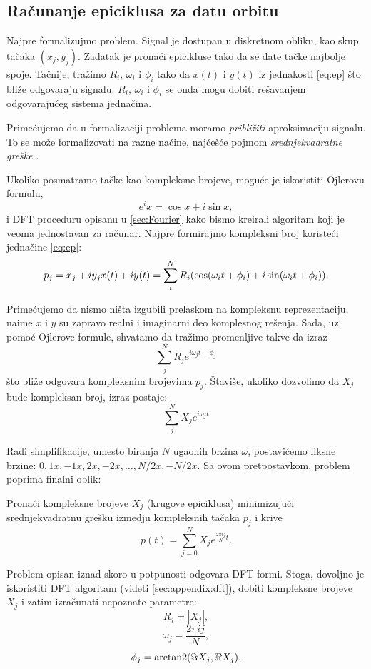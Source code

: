 \subsection{Ra\v{c}unanje epiciklusa za datu orbitu}

Najpre formalizujmo problem. Signal je dostupan u diskretnom obliku, kao skup ta\v{c}aka $(x_j,y_j)$. Zadatak je prona\'c{}i epicikluse tako da se date ta\v{c}ke najbolje spoje. Ta\v{c}nije, tra\v{z}imo $R_i$, $\omega_i$ i $\phi_i$ tako da $x(t)$ i $y(t)$ iz jednakosti \ref{eq:ep} \v{s}to bli\v{z}e odgovaraju signalu. $R_i$, $\omega_i$ i $\phi_i$ se onda mogu dobiti re\v{s}avanjem odgovaraju\'c{}eg sistema jedna\v{c}ina.

Prime\'c{}ujemo da u formalizaciji problema moramo \emph{pribli\v{z}iti} aproksimaciju signalu. To se mo\v{z}e formalizovati na razne na\v{c}ine, naj\v{c}e\v{s}\'c{}e pojmom \emph{srednjekvadratne gre\v{s}ke} \cite{NI}.

Ukoliko posmatramo ta\v{c}ke kao kompleksne brojeve, mogu\'c{}e je iskoristiti Ojlerovu formulu,
$$e^ix = \cos x + i\sin x,$$
i DFT proceduru opisanu u \ref{sec:Fourier} kako bismo kreirali algoritam koji je veoma jednostavan za ra\v{c}unar. Najpre formirajmo kompleksni broj koriste\'c{}i jedna\v{c}ine \ref{eq:ep}:
$$p_j = x_j + iy_j \\ x(t) + iy(t) = \sum_i^N R_i(\cos(\omega_i t + \phi_i) + i\sin(\omega_i t + \phi_i)).$$

Prime\'c{}ujemo da nismo ni\v{s}ta izgubili prelaskom na kompleksnu reprezentaciju, naime $x$ i $y$ su zapravo realni i imaginarni deo komplesnog re\v{s}enja. Sada, uz pomo\'c{} Ojlerove formule, shvatamo da tra\v{z}imo promenljive takve da izraz
$$\sum_j^N R_je^{i\omega_j t+ \phi_j}$$
\v{s}to bli\v{z}e odgovara kompleksnim brojevima $p_j$. \v{S}tavi\v{s}e, ukoliko dozvolimo da $X_j$ bude kompleksan broj, izraz postaje:
$$\sum_j^N X_je^{i\omega_j t}$$

Radi simplifikacije, umesto biranja $N$ ugaonih brzina $\omega$, postavi\'c{}emo fiksne brzine: $0, 1x, -1x, 2x, -2x, \dots , N/2x, -N/2x$. Sa ovom pretpostavkom, problem poprima finalni oblik:

\begin{prob}
    Prona\'c{}i kompleksne brojeve $X_j$ (krugove epiciklusa) minimizuju\'c{}i srednjekvadratnu gre\v{s}ku izmedju kompleksnih ta\v{c}aka $p_j$ i krive
    $$p(t) = \sum_{j=0}^N X_je^{\frac{2\pi i j}{N}t}.$$
\end{prob}

Problem opisan iznad skoro u potpunosti odgovara DFT formi. Stoga, dovoljno je iskoristiti DFT algoritam (videti \ref{sec:appendix:dft}), dobiti kompleksne brojeve $X_j$ i zatim izra\v{c}unati nepoznate parametre:
$$R_j = |X_j|,$$
$$\omega_j = \frac{2 \pi i j}{N},$$
$$\phi_j = \operatorname{arctan2}(\Im{X_j}, \Re{X_j}).$$
